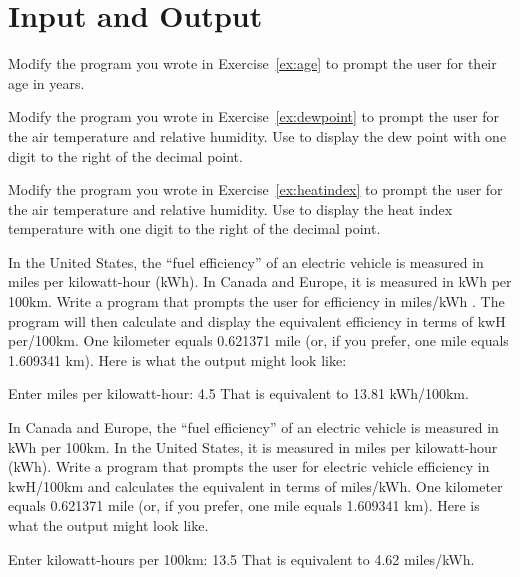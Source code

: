 \chapter{Input and Output}

\begin{exercise}
Modify the program you wrote in Exercise~\ref{ex:age} to prompt the user for their age in years.
\end{exercise}

\begin{exercise}
\label{ex:dewpoint2}
Modify the program you wrote in Exercise~\ref{ex:dewpoint} to prompt the user for the air temperature and relative humidity. Use  to display the dew point with one digit to the right of the decimal point.
\end{exercise}

\begin{exercise}
Modify the program you wrote in Exercise~\ref{ex:heatindex} to prompt the user for the air temperature and relative humidity. Use  to display the heat index temperature with one digit to the right of the decimal point.
\end{exercise}

\begin{exercise}
\label{ex:electricvehicle1}
In the United States, the ``fuel efficiency'' of an electric vehicle is measured in miles per kilowatt-hour (kWh). In Canada and Europe, it is measured in kWh per 100km. Write a program that prompts the user for efficiency in miles/kWh . The program will then calculate and display the equivalent efficiency in terms of kwH per/100km. One kilometer equals 0.621371 mile (or, if you prefer, one mile equals 1.609341 km). Here is what the output might look like:

\begin{stdout}
Enter miles per kilowatt-hour: 4.5
That is equivalent to 13.81 kWh/100km.
\end{stdout}

\end{exercise}

\begin{exercise}
\label{ex:electricvehicle2}
In Canada and Europe, the ``fuel efficiency'' of an electric vehicle is measured in kWh per 100km. In the United States, it is measured in miles per kilowatt-hour (kWh).  Write a program that prompts the user for electric vehicle efficiency in kwH/100km and calculates the equivalent in terms of miles/kWh.  One kilometer equals 0.621371 mile (or, if you prefer, one mile equals 1.609341 km). Here is what the output might look like.

\begin{stdout}
Enter kilowatt-hours per 100km: 13.5
That is equivalent to 4.62 miles/kWh.
\end{stdout}
\end{exercise}


